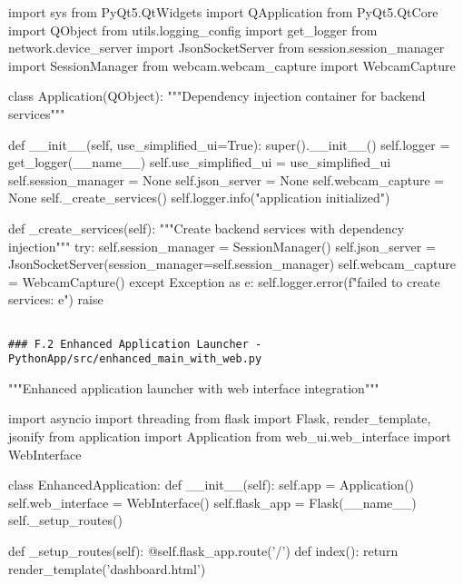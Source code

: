 \documentclass[12pt,a4paper]{report}
\begin{document}
import sys
from PyQt5.QtWidgets import QApplication
from PyQt5.QtCore import QObject
from utils.logging\_config import get\_logger
from network.device\_server import JsonSocketServer
from session.session\_manager import SessionManager
from webcam.webcam\_capture import WebcamCapture


class Application(QObject):
    """Dependency injection container for backend services"""

    def \_\_init\_\_(self, use\_simplified\_ui=True):
        super().\_\_init\_\_()
        self.logger = get\_logger(\_\_name\_\_)
        self.use\_simplified\_ui = use\_simplified\_ui
        self.session\_manager = None
        self.json\_server = None
        self.webcam\_capture = None
        self.\_create\_services()
        self.logger.info("application initialized")

    def \_create\_services(self):
        """Create backend services with dependency injection"""
        try:
            self.session\_manager = SessionManager()
            self.json\_server = JsonSocketServer(session\_manager=self.session\_manager)
            self.webcam\_capture = WebcamCapture()
        except Exception as e:
            self.logger.error(f"failed to create services: {e}")
            raise
\begin{verbatim}

### F.2 Enhanced Application Launcher - PythonApp/src/enhanced_main_with_web.py

\end{verbatim}
"""Enhanced application launcher with web interface integration"""

import asyncio
import threading
from flask import Flask, render\_template, jsonify
from application import Application
from web\_ui.web\_interface import WebInterface


class EnhancedApplication:
    def \_\_init\_\_(self):
        self.app = Application()
        self.web\_interface = WebInterface()
        self.flask\_app = Flask(\_\_name\_\_)
        self.\_setup\_routes()

    def \_setup\_routes(self):
        @self.flask\_app.route('/')
        def index():
            return render\_template('dashboard.html')
\end{document}
